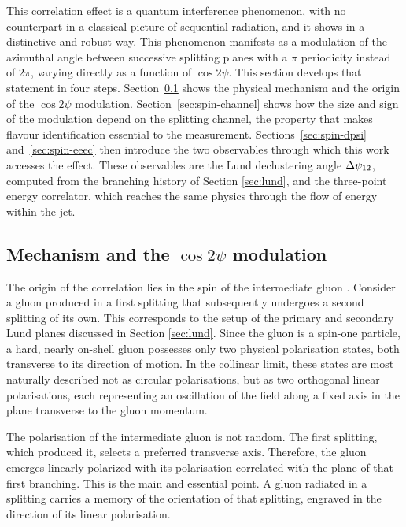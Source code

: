 This correlation effect is a quantum interference phenomenon, with no counterpart in a
classical picture of sequential radiation, and it shows in a distinctive and robust way.
This phenomenon manifests as a modulation of the azimuthal angle between 
successive splitting planes with a $\pi$ periodicity instead of $2\pi$, 
varying directly as a function of $\cos 2\psi$. This section develops that statement
in four steps. Section~\ref{sec:spin-mechanism} shows the physical mechanism and the origin
of the $\cos 2\psi$ modulation. Section~\ref{sec:spin-channel} shows how the size
and sign of the modulation depend on the splitting channel, the property that
makes flavour identification essential to the measurement. 
Sections~\ref{sec:spin-dpsi} and~\ref{sec:spin-eeec} then introduce the two
observables through which this work accesses the effect.
These observables are the Lund declustering angle $\Delta\psi_{12}$, computed from 
the branching history of Section \ref{sec:lund}, and the three-point energy correlator, which reaches the same physics through the flow of
energy within the jet.

\subsection{Mechanism and the \texorpdfstring{$\cos 2\psi$}{cos 2psi} modulation}
\label{sec:spin-mechanism}

The origin of the correlation lies in the spin of the intermediate gluon \cite{Karlberg_2021}. 
Consider a gluon produced in a first splitting that subsequently undergoes a second splitting 
of its own. This corresponds to the setup of the primary and secondary Lund planes discussed 
in Section \ref{sec:lund}. Since the gluon is a spin-one particle, a hard, nearly on-shell 
gluon possesses only two physical polarisation states, both transverse to its direction of 
motion. In the collinear limit, these states are most naturally described not as circular 
polarisations, but as two orthogonal linear polarisations, each representing an oscillation 
of the field along a fixed axis in the plane transverse to the gluon momentum.

The polarisation of the intermediate gluon is not random. The first splitting,
which produced it, selects a preferred transverse axis. Therefore, the gluon emerges linearly
polarized with its polarisation correlated with the plane of that first branching.
This is the main and essential point. A gluon radiated in a splitting carries a memory
of the orientation of that splitting, engraved in the direction of its linear polarisation.


